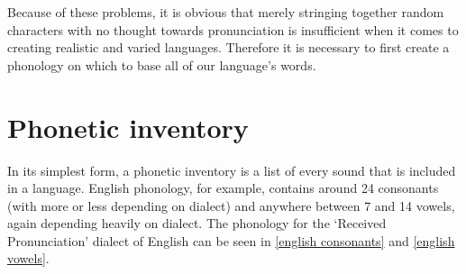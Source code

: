 \documentclass{report}
\begin{document}
   Because of these problems, it is obvious that merely stringing together random characters with no thought towards pronunciation is insufficient when it comes to creating realistic and varied languages. Therefore it is necessary to first create a phonology on which to base all of our language's words.
   
   \section{Phonetic inventory}
   \label{section: phonetic inventory}
   
   In its simplest form, a phonetic inventory is a list of every sound that is included in a language. English phonology, for example, contains around 24 consonants (with more or less depending on dialect) and anywhere between 7 and 14 vowels, again depending heavily on dialect. The phonology for the `Received Pronunciation' dialect of English can be seen in \ref{english consonants} and \ref{english vowels}.
   
  \begin{table}[h]
  	\caption{Consonant inventory in English phonology}
  	\label{english consonants}
  	\centering
  \end{table}
\end{document}

